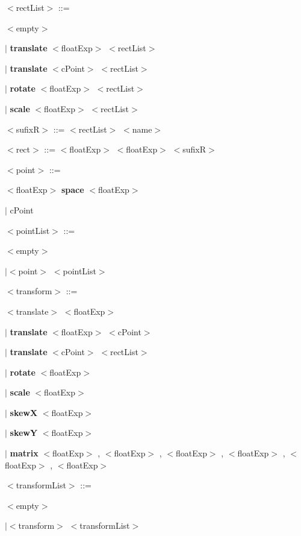 \documentclass[a4paper,10pt]{article}
\begin{document}
{\medskip
$<$rectList$>$ ::= 

    \setlength{\leftskip}{0.5cm}
    $<$empty$>$

    $|$ {\bfseries translate} $<$floatExp$>$ $<$rectList$>$

    $|$ {\bfseries translate} $<$cPoint$>$ $<$rectList$>$

    $|$ {\bfseries rotate} $<$floatExp$>$ $<$rectList$>$

    $|$ {\bfseries scale} $<$floatExp$>$ $<$rectList$>$

    \setlength{\leftskip}{0cm}

\medskip
$<$sufixR$>$ ::= $<$rectList$>$ $<$name$>$

\medskip
$<$rect$>$ ::= $<$floatExp$>$ $<$floatExp$>$ $<$sufixR$>$

\medskip
$<$point$>$ ::= 

    \setlength{\leftskip}{0.5cm}
    $<$floatExp$>$ {\bfseries space} $<$floatExp$>$

    $|$ cPoint

    \setlength{\leftskip}{0cm}

\medskip
$<$pointList$>$ ::= 

    \setlength{\leftskip}{0.5cm}
    $<$empty$>$

    $| <$point$>$ $<$pointList$>$

    \setlength{\leftskip}{0cm}

\medskip
$<$transform$>$ ::= 

    \setlength{\leftskip}{0.5cm}
    $<$translate$>$ $<$floatExp$>$

    $|$ {\bfseries translate} $<$floatExp$>$ $<$cPoint$>$

    $|$ {\bfseries translate} $<$cPoint$>$ $<$rectList$>$

    $|$ {\bfseries rotate} $<$floatExp$>$

    $|$ {\bfseries scale} $<$floatExp$>$

    $|$ {\bfseries skewX} $<$floatExp$>$

    $|$ {\bfseries skewY} $<$floatExp$>$
    
    $|$ {\bfseries matrix} $<$floatExp$>$ , $<$floatExp$>$ , $<$floatExp$>$ , $<$floatExp$>$ , $<$floatExp$>$
    , $<$floatExp$>$

    \setlength{\leftskip}{0cm}

\medskip
$<$transformList$>$ ::= 

    \setlength{\leftskip}{0.5cm}
    $<$empty$>$

    $| <$transform$>$ $<$transformList$>$

}
\end{document}

